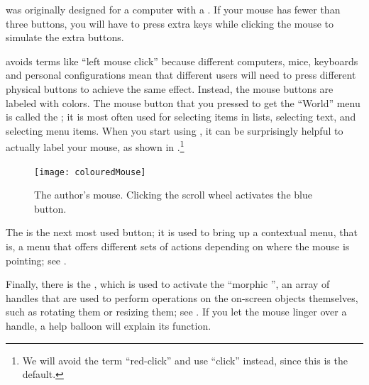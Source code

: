 \documentclass[a4paper,10pt,twoside]{book}
\begin{document}
\sq was originally designed for a computer with a .  If your mouse has fewer than three buttons, you will have to press extra keys while clicking the mouse to simulate the extra buttons.

\sq avoids terms like ``left mouse click'' because different computers, mice, keyboards and personal configurations mean that different users will need to press different physical buttons to achieve the same effect.  Instead, the mouse buttons are labeled with colors.  The mouse button that you pressed to get the ``World'' menu is called the ; it is most often used for selecting items in lists, selecting text, and selecting menu items.
When you start using \sq, it can be surprisingly helpful to actually label your mouse, as shown in .\footnote{We will avoid the term ``red-click'' and use ``click'' instead, since this is the default.}

\begin{figure}
\texttt{[image: colouredMouse]}
\caption{The author's mouse. Clicking the scroll wheel activates the blue button.}
\label{fig:colouredMouse}
\end{figure}

The  is the next most used button; it is used to bring up a contextual menu, that is, a menu that offers different sets of actions depending on where the mouse is pointing; see .


Finally, there is the , which is used to activate the ``morphic '', an array of handles that are used to perform operations on the on-screen objects themselves, such as rotating them or resizing them; see . 
If you let the mouse linger over a handle, a help balloon will explain its function.


\end{document}
